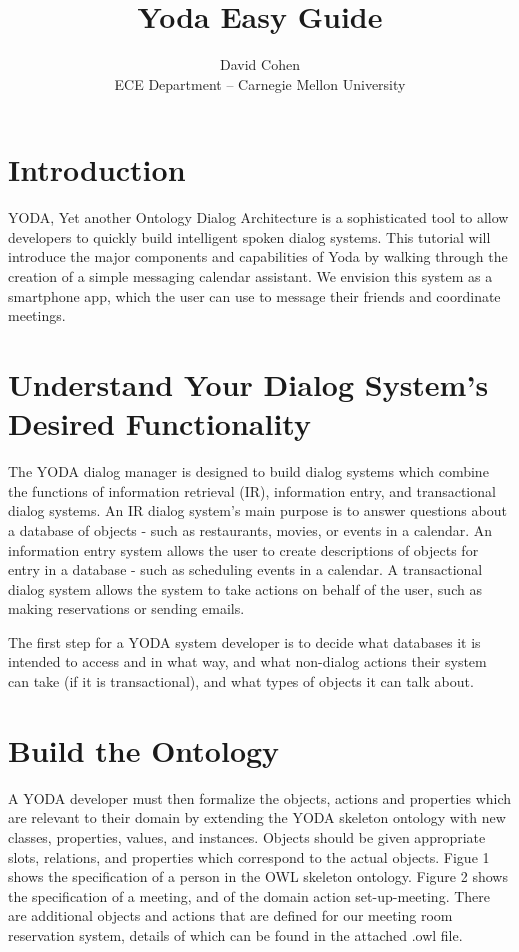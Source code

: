 \documentclass[10pt]{article}
\begin{document}
\title{Yoda Easy Guide}
\author{David Cohen\\
ECE Department -- Carnegie Mellon University}
\date{}
\maketitle

\section{Introduction}

\noindent YODA, Yet another Ontology Dialog Architecture is a sophisticated tool to allow developers to quickly build intelligent spoken dialog systems.
This tutorial will introduce the major components and capabilities of Yoda by walking through the creation of a simple messaging calendar assistant.
We envision this system as a smartphone app, which the user can use to message their friends and coordinate meetings.


\section {Understand Your Dialog System's Desired Functionality}
The YODA dialog manager is designed to build dialog systems which combine the functions of information retrieval (IR), information entry, and transactional dialog systems.
An IR dialog system's main purpose is to answer questions about a database of objects - such as restaurants, movies, or events in a calendar.
An information entry system allows the user to create descriptions of objects for entry in a database - such as scheduling events in a calendar.
A transactional dialog system allows the system to take actions on behalf of the user, such as making reservations or sending emails.

The first step for a YODA system developer is to decide what databases it is intended to access and in what way, and what non-dialog actions their system can take (if it is transactional), and what types of objects it can talk about.


\section {Build the Ontology}

A YODA developer must then formalize the objects, actions and properties which are relevant to their domain by extending the YODA skeleton ontology with new classes, properties, values, and instances.
Objects should be given appropriate slots, relations, and properties which correspond to the actual objects.
Figue 1 shows the specification of a person in the OWL skeleton ontology.
Figure 2 shows the specification of a meeting, and of the domain action set-up-meeting.
There are additional objects and actions that are defined for our meeting room reservation system, details of which can be found in the attached .owl file.
\end{document}
